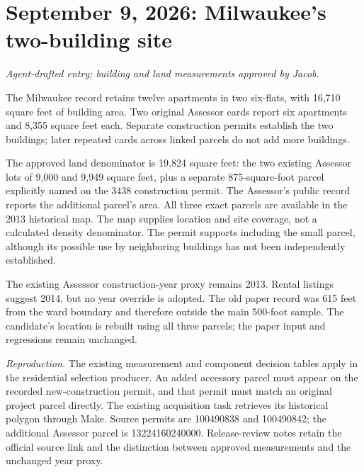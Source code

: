 \clearpage
\section*{September 9, 2026: Milwaukee's two-building site}
\textit{Agent-drafted entry; building and land measurements approved by Jacob.}

The Milwaukee record retains twelve apartments in two six-flats, with 16,710 square feet of building area. Two original Assessor cards report six apartments and 8,355 square feet each. Separate construction permits establish the two buildings; later repeated cards across linked parcels do not add more buildings.

The approved land denominator is 19,824 square feet: the two existing Assessor lots of 9,000 and 9,949 square feet, plus a separate 875-square-foot parcel explicitly named on the 3438 construction permit. The Assessor's public record reports the additional parcel's area. All three exact parcels are available in the 2013 historical map. The map supplies location and site coverage, not a calculated density denominator. The permit supports including the small parcel, although its possible use by neighboring buildings has not been independently established.

The existing Assessor construction-year proxy remains 2013. Rental listings suggest 2014, but no year override is adopted. The old paper record was 615 feet from the ward boundary and therefore outside the main 500-foot sample. The candidate's location is rebuilt using all three parcels; the paper input and regressions remain unchanged.

\medskip
\noindent\textit{Reproduction.} The existing measurement and component decision tables apply in the residential selection producer. An added accessory parcel must appear on the recorded new-construction permit, and that permit must match an original project parcel directly. The existing acquisition task retrieves its historical polygon through Make. Source permits are 100490838 and 100490842; the additional Assessor parcel is 13224160240000. Release-review notes retain the official source link and the distinction between approved measurements and the unchanged year proxy.
